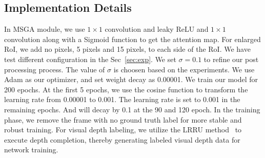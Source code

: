 \documentclass[journal]{IEEEtran}
\begin{document}
	\subsection{Implementation Details}\label{imple}
	In MSGA module, we use $1\times 1$ convolution and leaky ReLU and $1\times 1$ convolution along with a Sigmoid function to get the attention map. For enlarged RoI, we add no pixels, 5 pixels and 15 pixels, to each side of the RoI. We have test different configuration in the Sec~\ref{sec:exp}. We set $\sigma=0.1$ to refine our post processing process. The value of $\sigma$ is choosen based on the experiments. We use Adam as our optimizer, and set weight decay as 0.00001. We train our model for 200 epochs. At the first 5 epochs, we use the cosine function to transform the learning rate from 0.00001 to 0.001. The learning rate is set to 0.001 in the remaining epochs. And will decay by 0.1 at the 90 and 120 epoch. In the training phase, we remove the frame with no ground truth label for more stable and robust training. For visual depth labeling, we utilize the LRRU method~\cite{lrru} to execute depth completion, thereby generating labeled visual depth data for network training.
	
\end{document}
